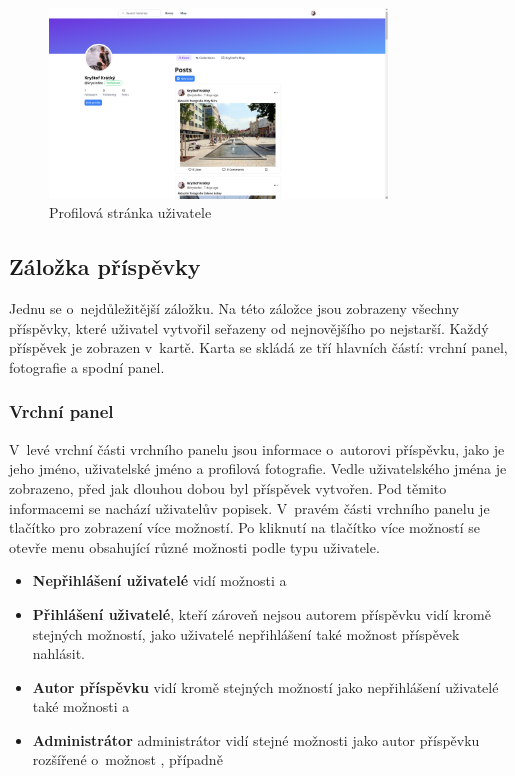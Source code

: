 \documentclass[12pt, a4paper,
  oneside,      %
]{report}
\begin{document}
\begin{figure}[h]
	\centering
	\includegraphics[width=0.8\textwidth]{images/user_page.png}
	\caption{Profilová stránka uživatele}\label{profilePageScreenshot}
\end{figure}

\subsection{Záložka příspěvky}
Jednu se o~nejdůležitější záložku. Na této záložce jsou zobrazeny všechny příspěvky, které uživatel vytvořil seřazeny od nejnovějšího po nejstarší. Každý příspěvek je zobrazen v~kartě. Karta se skládá ze tří hlavních částí: vrchní panel, fotografie a spodní panel. 
\subsubsection{Vrchní panel}
V~levé vrchní části vrchního panelu jsou informace o~autorovi příspěvku, jako je jeho jméno, uživatelské jméno a profilová fotografie. Vedle uživatelského jména je zobrazeno, před jak dlouhou dobou byl příspěvek vytvořen. Pod těmito informacemi se nachází uživatelův popisek. V~pravém části vrchního panelu je tlačítko pro zobrazení více možností. Po kliknutí na tlačítko více možností se otevře menu obsahující různé možnosti podle typu uživatele.
\begin{itemize}
    \item \textbf{Nepřihlášení uživatelé} vidí možnosti  a 
    \item \textbf{Přihlášení uživatelé}, kteří zároveň nejsou autorem příspěvku vidí kromě stejných možností, jako uživatelé nepřihlášení také možnost příspěvek nahlásit.
    \item \textbf{Autor příspěvku} vidí kromě stejných možností jako nepřihlášení uživatelé také možnosti  a 
    \item \textbf{Administrátor} administrátor vidí stejné možnosti jako autor příspěvku rozšířené o~možnost , případně 
\end{itemize}
\end{document}
